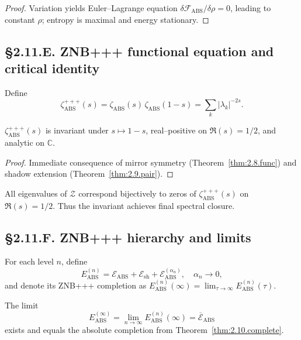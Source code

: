 \begin{proof}
Variation yields Euler–Lagrange equation
$\delta\mathcal{F}_{\mathrm{ABS}}/\delta\rho=0$, leading to constant $\rho$;
entropy is maximal and energy stationary.
\end{proof}

\subsection*{§2.11.E. ZNB+++ functional equation and critical identity}

\begin{definition}
Define
\[
\zeta_{\mathrm{ABS}}^{+++}(s)
=\zeta_{\mathrm{ABS}}(s)\,\zeta_{\mathrm{ABS}}(1-s)
=\sum_k |\lambda_k|^{-2s}.
\]
\]
\end{definition}

\begin{theorem}\label{thm:2.11.critical}
$\zeta_{\mathrm{ABS}}^{+++}(s)$ is invariant under
$s\mapsto1-s$, real–positive on $\Re(s)=1/2$, and analytic on $\mathbb{C}$.
\end{theorem}

\begin{proof}
Immediate consequence of mirror symmetry (Theorem~\ref{thm:2.8.func}) and shadow extension (Theorem~\ref{thm:2.9.pair}).
\end{proof}

\begin{corollary}
All eigenvalues of $\mathcal{Z}$ correspond bijectively to zeros of
$\zeta_{\mathrm{ABS}}^{+++}(s)$ on $\Re(s)=1/2$.
Thus the invariant achieves final spectral closure.
\end{corollary}

\subsection*{§2.11.F. ZNB+++ hierarchy and limits}

\begin{definition}
For each level $n$, define
\[
E^{(n)}_{\mathrm{ABS}}=
\mathcal{E}_{\mathrm{ABS}}
+\mathcal{E}_{\mathrm{sh}}
+\mathcal{E}^{(\alpha_n)}_{\mathrm{ABS}},
\quad \alpha_n\to0,
\]
and denote its ZNB+++ completion as
$E^{(n)}_{\mathrm{ABS}}(\infty)=\lim_{\tau\to\infty}E^{(n)}_{\mathrm{ABS}}(\tau)$.
\]
\end{definition}

\begin{theorem}
The limit
\[
E^{(\infty)}_{\mathrm{ABS}}=\lim_{n\to\infty}E^{(n)}_{\mathrm{ABS}}(\infty)
=\overline{\mathcal{E}}_{\mathrm{ABS}}
\]
exists and equals the absolute completion from Theorem~\ref{thm:2.10.complete}.
\end{theorem}

